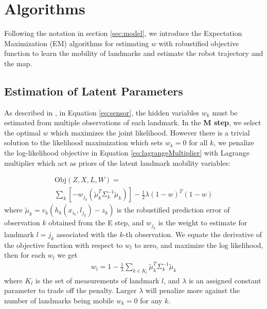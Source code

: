 \section{Algorithms}
Following the notation in section \ref{sec:model}, we introduce the Expectation Maximization (EM) algorithms for estimating $w$ with robustified objective function to learn the mobility of landmarks and estimate the robot trajectory and the map.

\subsection{Estimation of Latent Parameters}
\label{sec:traditionalEM}

As described in \cite{rogers2010slam}, in Equation \ref{eq:sensor}, the hidden variables $w_k$ must be estimated from multiple observations of each landmark. In the \textbf{M step}, we select the optimal $w$ which maximizes the joint likelihood. However there is a trivial solution to the likelihood maximization which sets $w_k = 0$ for all $k$, we penalize the log-likelihood objective in Equation \ref{eq:lagrangeMultiplier} with Lagrange multiplier which act as priors of the latent landmark mobility variables:

\begin{multline}
\mathrm{Obj}(Z, X, L, W) = \\ \sum_k \left[ -w_{j_k}(\tilde{\mu}^T_k\Sigma_k^{-1}\tilde{\mu}_k) \right] - \frac{1}{2}\lambda(1 - w)^T(1 - w)
\label{eq:lagrangeMultiplier}
\end{multline}
where $\tilde{\mu}_k = v_k (h_k(x_{i_k}, l_{j_k}) - z_k)$ is the robustified prediction error of observation $k$ obtained from the E step, and $w_{j_k}$ is the weight to estimate for landmark $l = j_k$ associated with the $k$-th observation. We equate the derivative of the objective function with respect to $w_l$ to zero, and maximize the log likelihood, then for each $w_l$ we get
\begin{equation}
\begin{aligned}
w_l = 1 - \frac{1}{\lambda} \sum_{k \in K_l}\tilde{\mu}^T_k\Sigma_k^{-1}\tilde{\mu}_k
\end{aligned}
\label{eq:wk}
\end{equation}
where $K_l$ is the set of measurements of landmark $l$, and $\lambda$ is an assigned constant parameter to trade off the penalty. Larger $\lambda$ will penalize more against the number of landmarks being mobile $w_k = 0$ for any $k$.

